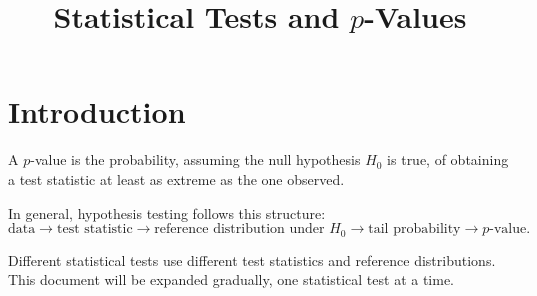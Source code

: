 \documentclass[11pt]{article}
\title{Statistical Tests and \(p\)-Values}
\author{}
\date{}
\begin{document}
\maketitle
\tableofcontents
\newpage

\section*{Introduction}
A \(p\)-value is the probability, assuming the null hypothesis \(H_0\) is true, of obtaining a test statistic at least as extreme as the one observed.

In general, hypothesis testing follows this structure:
\[
\text{data}
\rightarrow
\text{test statistic}
\rightarrow
\text{reference distribution under }H_0
\rightarrow
\text{tail probability}
\rightarrow
p\text{-value}.
\]

Different statistical tests use different test statistics and reference distributions. This document will be expanded gradually, one statistical test at a time.
\end{document}
